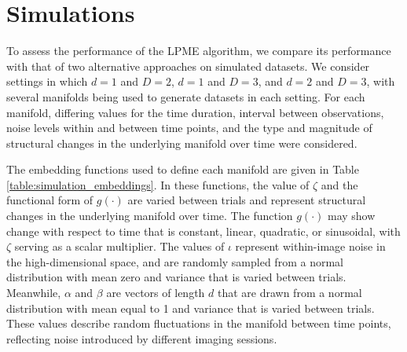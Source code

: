 \documentclass[11pt,reqno]{article}
\theoremstyle{definition}
\begin{document}
\section{Simulations}\label{s:simulations}

To assess the performance of the LPME algorithm, we compare its performance with that of two alternative approaches on simulated datasets. We consider settings in which $d = 1$ and $D = 2$, $d = 1$ and $D = 3$, and $d = 2$ and $D = 3$, with several manifolds being used to generate datasets in each setting. For each manifold, differing values for the time duration, interval between observations, noise levels within and between time points, and the type and magnitude of structural changes in the underlying manifold over time were considered. 

The embedding functions used to define each manifold are given in Table \ref{table:simulation_embeddings}. In these functions, the value of $\zeta$ and the functional form of $g(\cdot)$ are varied between trials and represent structural changes in the underlying manifold over time. The function $g(\cdot)$ may show change with respect to time that is constant, linear, quadratic, or sinusoidal, with $\zeta$ serving as a scalar multiplier. The values of $\iota$ represent within-image noise in the high-dimensional space, and are randomly sampled from a normal distribution with mean zero and variance that is varied between trials. Meanwhile, $\alpha$ and $\beta$ are vectors of length $d$ that are drawn from a normal distribution with mean equal to 1 and variance that is varied between trials. These values describe random fluctuations in the manifold between time points, reflecting noise introduced by different imaging sessions.
\end{document}
